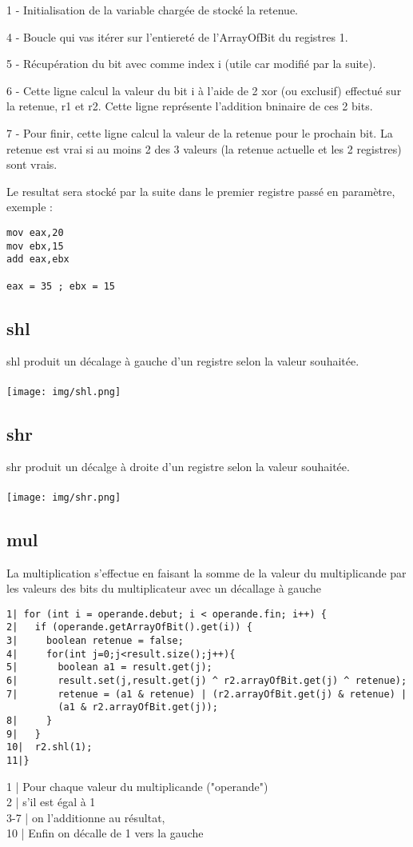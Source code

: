 \documentclass{article}
\begin{document}
1 - Initialisation de la variable chargée de stocké la retenue.

4 - Boucle qui vas itérer sur l'entiereté de l'ArrayOfBit du registres 1.

5 - Récupération du bit avec comme index i (utile car modifié par la suite).

6 - Cette ligne calcul la valeur du bit i à l'aide de 2 xor (ou exclusif) effectué sur la retenue, r1 et r2. Cette ligne représente l'addition bninaire de ces 2 bits.

7 - Pour finir, cette ligne calcul la valeur de la retenue pour le prochain bit. La retenue est vrai si au moins 2 des 3 valeurs (la retenue actuelle et les 2 registres) sont vrais.

Le resultat sera stocké par la suite dans le premier registre passé en paramètre, exemple :
\begin{verbatim}
mov eax,20
mov ebx,15
add eax,ebx

eax = 35 ; ebx = 15
\end{verbatim}

\newpage
\subsection{shl}
shl produit un décalage à gauche d'un registre selon la valeur souhaitée.
\\
\\
\texttt{[image: img/shl.png]}

\subsection{shr}
shr produit un décalge à droite d'un registre selon la valeur souhaitée.
\\
\\
\texttt{[image: img/shr.png]}
\newpage
\subsection{mul}
La multiplication s'effectue en faisant la somme de la valeur du multiplicande par les valeurs des bits du multiplicateur avec un décallage à gauche
\begin{verbatim}
1| for (int i = operande.debut; i < operande.fin; i++) {
2|   if (operande.getArrayOfBit().get(i)) {
3|     boolean retenue = false;
4|     for(int j=0;j<result.size();j++){
5|       boolean a1 = result.get(j);
6|       result.set(j,result.get(j) ^ r2.arrayOfBit.get(j) ^ retenue);
7|       retenue = (a1 & retenue) | (r2.arrayOfBit.get(j) & retenue) |
         (a1 & r2.arrayOfBit.get(j));
8|     }
9|   }
10|  r2.shl(1);
11|}
\end{verbatim}
1 | Pour chaque valeur du multiplicande ("operande")\\
2 | s'il est égal à 1\\
3-7 | on l'additionne au résultat,\\
10 | Enfin on décalle de 1 vers la gauche\\
\end{document}
